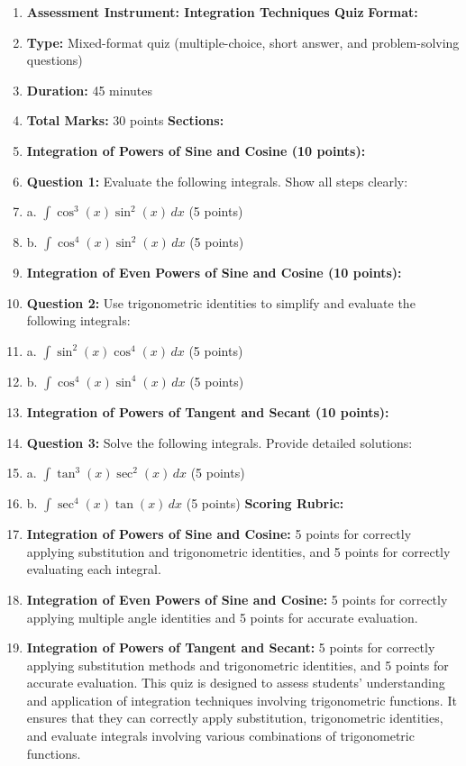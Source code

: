 \begin{enumerate}
    \item \textbf{Assessment Instrument: Integration Techniques Quiz} \textbf{Format:}
    \item \textbf{Type:} Mixed-format quiz (multiple-choice, short answer, and problem-solving questions)
    \item \textbf{Duration:} 45 minutes
    \item \textbf{Total Marks:} 30 points \textbf{Sections:}
    \item \textbf{Integration of Powers of Sine and Cosine (10 points):}
    \item \textbf{Question 1:} Evaluate the following integrals. Show all steps clearly:
    \item a. $\int \cos^3(x) \sin^2(x) \, dx$ (5 points)
    \item b. $\int \cos^4(x) \sin^2(x) \, dx$ (5 points)
    \item \textbf{Integration of Even Powers of Sine and Cosine (10 points):}
    \item \textbf{Question 2:} Use trigonometric identities to simplify and evaluate the following integrals:
    \item a. $\int \sin^2(x) \cos^4(x) \, dx$ (5 points)
    \item b. $\int \cos^4(x) \sin^4(x) \, dx$ (5 points)
    \item \textbf{Integration of Powers of Tangent and Secant (10 points):}
    \item \textbf{Question 3:} Solve the following integrals. Provide detailed solutions:
    \item a. $\int \tan^3(x) \sec^2(x) \, dx$ (5 points)
    \item b. $\int \sec^4(x) \tan(x) \, dx$ (5 points) \textbf{Scoring Rubric:}
    \item \textbf{Integration of Powers of Sine and Cosine:} 5 points for correctly applying substitution and trigonometric identities, and 5 points for correctly evaluating each integral.
    \item \textbf{Integration of Even Powers of Sine and Cosine:} 5 points for correctly applying multiple angle identities and 5 points for accurate evaluation.
    \item \textbf{Integration of Powers of Tangent and Secant:} 5 points for correctly applying substitution methods and trigonometric identities, and 5 points for accurate evaluation. This quiz is designed to assess students' understanding and application of integration techniques involving trigonometric functions. It ensures that they can correctly apply substitution, trigonometric identities, and evaluate integrals involving various combinations of trigonometric functions.
\end{enumerate}

